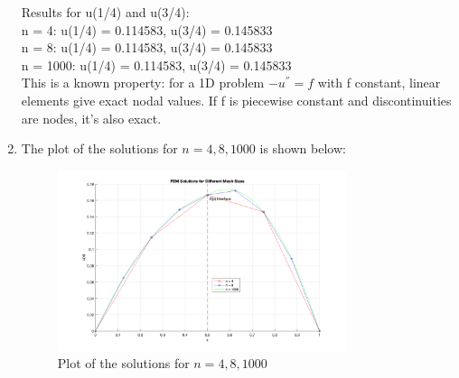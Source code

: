 \documentclass[english,onecolumn]{IEEEtran}
\begin{document}
\begin{enumerate}
    Results for u(1/4) and u(3/4):\\
    n = 4: u(1/4) = 0.114583, u(3/4) = 0.145833\\
    n = 8: u(1/4) = 0.114583, u(3/4) = 0.145833\\
    n = 1000: u(1/4) = 0.114583, u(3/4) = 0.145833\\
    This is a known property: for a 1D problem $-u^{''} =f $ with f constant, linear elements give exact nodal values. If f is piecewise constant and discontinuities are nodes, it's also exact. \\
    \item The plot of the solutions for $n = 4, 8, 1000$ is shown below:
    \begin{figure}[h]
        \centering
        \includegraphics[width=0.8\textwidth]{p3.png}
        \caption{Plot of the solutions for $n = 4, 8, 1000$}
        \label{fig:solution_plot}
    \end{figure}
\end{enumerate}
\end{document}
